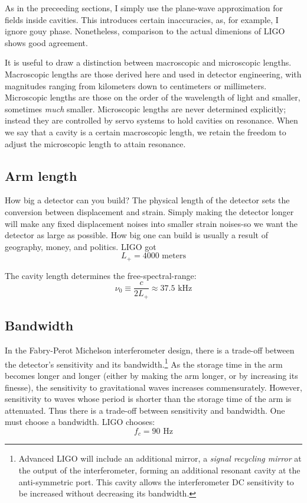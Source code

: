 As in the preceeding sections, I simply use the plane-wave
approximation for fields inside cavities. This introduces certain
inaccuracies, as, for example, I ignore gouy phase. Nonetheless,
comparison to the actual dimenions of LIGO shows good agreement.

It is useful to draw a distinction between macroscopic and microscopic
lengths. Macroscopic lengths are those derived here and
used in detector engineering, with magnitudes ranging from kilometers
down to centimeters or millimeters. Microscopic lengths are those
on the order of the wavelength of light and smaller, sometimes \emph{much}
smaller. Microscopic lengths are never determined explicitly; instead
they are controlled by servo systems to hold cavities on resonance.
When we say that a cavity is a certain macroscopic length, we retain
the freedom to adjust the microscopic length to attain resonance.

\subsection*{Arm length}

How big a detector can you build? The physical length of the detector
sets the conversion between displacement and strain. Simply making the
detector longer will make any fixed displacement noises into smaller
strain noises-so we want the detector as large as possible. How big
one can build is usually a result of geography, money, and politics.
LIGO got
%
\begin{equation}
\boxed{{L_{+}=4000\text{{\ meters}}}}
\end{equation}

The cavity length determines the free-spectral-range:
%
\begin{equation}
\nu_0\equiv\frac{c}{2L_{+}}\approx37.5\text{ kHz}
\end{equation}



\subsection*{Bandwidth}

In the Fabry-Perot Michelson interferometer design, there is a trade-off
between the detector's sensitivity and its bandwidth.\footnote{Advanced LIGO will include an additional mirror, a \emph{signal recycling mirror} at the output of the interferometer, forming an additional resonant cavity at the anti-symmetric port.  This cavity allows the interferometer DC sensitivity to be increased without decreasing its bandwidth.}  As the storage
time in the arm becomes longer and longer (either by making the arm
longer, or by increasing its finesse), the sensitivity to gravitational
waves increases commensurately. However, sensitivity to waves whose
period is shorter than the storage time of the arm is attenuated.
Thus there is a trade-off between sensitivity and bandwidth. 
One must choose a bandwidth. LIGO chooses:
%
\begin{equation}
f_{c}=90\text{\ Hz}
\end{equation}


